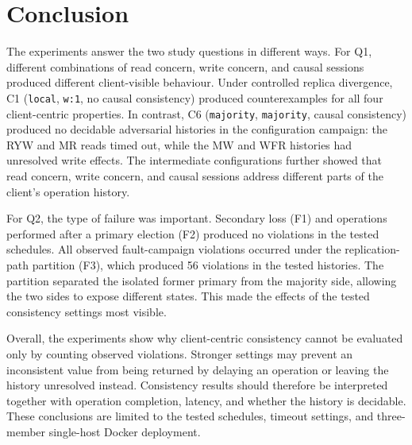 \section{Conclusion}

The experiments answer the two study questions in different ways. For Q1, 
different combinations of read concern, write concern, and causal
sessions produced different client-visible behaviour. Under controlled replica
divergence, C1 (\texttt{local}, \texttt{w:1}, no causal consistency) produced
counterexamples for all four client-centric properties. In contrast, C6
(\texttt{majority}, \texttt{majority}, causal consistency) produced no
decidable adversarial histories in the configuration campaign: the RYW and MR
reads timed out, while the MW and WFR histories had unresolved write effects.
The intermediate configurations further showed that read concern, write
concern, and causal sessions address different parts of the client's operation
history.

For Q2, the type of failure was important. Secondary loss (F1) and operations
performed after a primary election (F2) produced no violations in the tested
schedules. All observed fault-campaign violations occurred under the
replication-path partition (F3), which produced 56 violations in the tested
histories. The partition separated the isolated former primary from the
majority side, allowing the two sides to expose different states. This made
the effects of the tested consistency settings most visible.

Overall, the experiments show why client-centric consistency cannot be
evaluated only by counting observed violations. Stronger settings may prevent
an inconsistent value from being returned by delaying an operation or leaving
the history unresolved instead. Consistency results should therefore be
interpreted together with operation completion, latency, and whether the
history is decidable. These conclusions are limited to the tested schedules,
timeout settings, and three-member single-host Docker deployment.